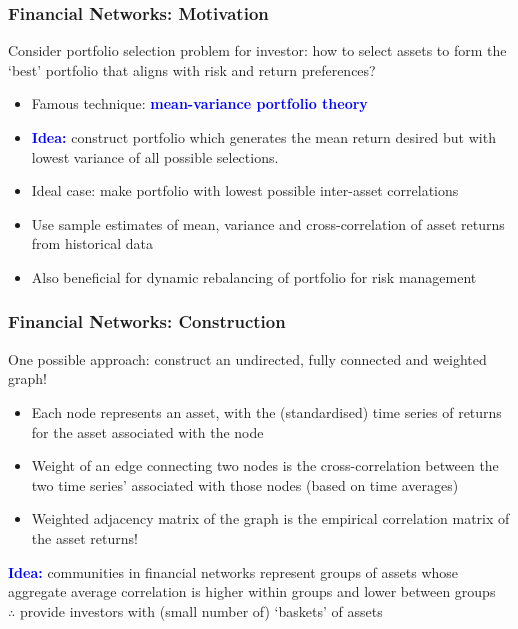 \documentclass{beamer}
\begin{document}

\begin{frame}
	\frametitle{Financial Networks: Motivation}
	Consider portfolio selection problem for investor: how to select assets to form the `best' portfolio that aligns with risk and return preferences?
	\begin{itemize}
		\vfill\item Famous technique: \textcolor{blue}{\textbf{mean-variance portfolio theory}}
		\vfill\item \textcolor{blue}{\textbf{Idea:}} construct portfolio which generates the mean return desired but with lowest variance of all possible selections.
		\vfill\item Ideal case: make portfolio with lowest possible inter-asset correlations
		\vfill\item Use sample estimates of mean, variance and cross-correlation of asset returns from historical data
		\vfill\item Also beneficial for dynamic rebalancing of portfolio for risk management
	\end{itemize}
\end{frame}


\begin{frame}
	\frametitle{Financial Networks: Construction}
	One possible approach: construct an undirected, fully connected and weighted graph!
	\begin{itemize}
		\vfill\item Each node represents an asset, with the (standardised) time series of returns for the asset associated with the node
		\vfill\item Weight of an edge connecting two nodes is the cross-correlation between the two time series' associated with those nodes (based on time averages)
		\vfill\item Weighted adjacency matrix of the graph is the empirical correlation matrix of the asset returns!
	\end{itemize}
	\textcolor{blue}{\textbf{Idea:}} communities in financial networks represent groups of assets whose aggregate average correlation is higher within groups and lower between groups \\
	$\therefore$ provide investors with (small number of) `baskets' of assets
\end{frame}
\end{document}
